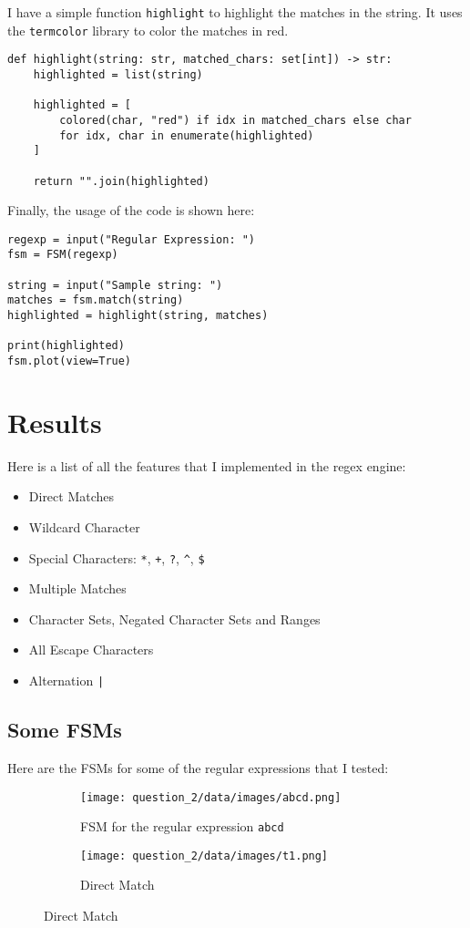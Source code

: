 \documentclass[12pt]{report}
\begin{document}
I have a simple function \texttt{highlight} to highlight the matches in the string. It uses the \texttt{termcolor} library to color the matches in red.

\begin{lstlisting}[caption={\texttt{highlight}}]
def highlight(string: str, matched_chars: set[int]) -> str:
    highlighted = list(string)

    highlighted = [
        colored(char, "red") if idx in matched_chars else char
        for idx, char in enumerate(highlighted)
    ]

    return "".join(highlighted)
\end{lstlisting}

Finally, the usage of the code is shown here:
\begin{lstlisting}[caption={Usage}]
regexp = input("Regular Expression: ")
fsm = FSM(regexp)

string = input("Sample string: ")
matches = fsm.match(string)
highlighted = highlight(string, matches)

print(highlighted)
fsm.plot(view=True)
\end{lstlisting}

\section{Results}

Here is a list of all the features that I implemented in the regex engine:
\begin{itemize}
    \item Direct Matches
    \item Wildcard Character
    \item Special Characters: \texttt{*}, \texttt{+}, \texttt{?}, \texttt{\textasciicircum}, \texttt{\$}
    \item Multiple Matches
    \item Character Sets, Negated Character Sets and Ranges
    \item All Escape Characters
    \item Alternation \texttt{|}
\end{itemize}

\subsection{Some FSMs}
Here are the FSMs for some of the regular expressions that I tested:

\begin{figure}[H]
    \centering
    \begin{subfigure}{0.7\textwidth}
        \texttt{[image: question\_2/data/images/abcd.png]}
        \caption{FSM for the regular expression \texttt{abcd}}
    \end{subfigure}
    \begin{subfigure}{0.5\textwidth}
        \texttt{[image: question\_2/data/images/t1.png]}
        \caption{Direct Match}
    \end{subfigure}
\end{figure}
\end{document}
